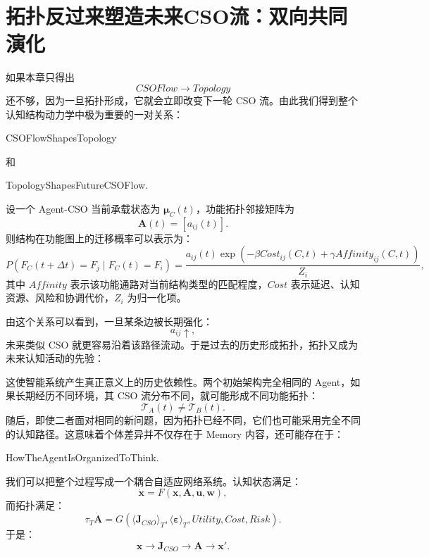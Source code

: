 \section{拓扑反过来塑造未来CSO流：双向共同演化}

如果本章只得出
\[
CSOFlow\rightarrow Topology
\]
还不够，因为一旦拓扑形成，它就会立即改变下一轮 CSO 流。由此我们得到整个认知结构动力学中极为重要的一对关系：
\begin{statementbox}
CSOFlowShapesTopology
\end{statementbox}
和
\begin{statementbox}
TopologyShapesFutureCSOFlow.
\end{statementbox}

设一个 Agent-CSO 当前承载状态为 $\boldsymbol{\mu}_C(t)$，功能拓扑邻接矩阵为
\[
\mathbf{A}(t)
=
[a_{ij}(t)].
\]
则结构在功能图上的迁移概率可以表示为：
\[
P
\left(
F_C(t+\Delta t)=F_j
\mid
F_C(t)=F_i
\right)
=
\frac{
a_{ij}(t)
\exp
\left(
-\beta Cost_{ij}(C,t)
+\gamma Affinity_{ij}(C,t)
\right)
}{
Z_i
},
\]
其中 $Affinity$ 表示该功能通路对当前结构类型的匹配程度，$Cost$ 表示延迟、认知资源、风险和协调代价，$Z_i$ 为归一化项。

由这个关系可以看到，一旦某条边被长期强化：
\[
a_{ij}\uparrow,
\]
未来类似 CSO 就更容易沿着该路径流动。于是过去的历史形成拓扑，拓扑又成为未来认知活动的先验：
\begin{statementbox}
\centering
{}
\end{statementbox}

这使智能系统产生真正意义上的历史依赖性。两个初始架构完全相同的 Agent，如果长期经历不同环境，其 CSO 流分布不同，就可能形成不同功能拓扑：
\[
\mathcal T_A(t)
\neq
\mathcal T_B(t).
\]
随后，即使二者面对相同的新问题，因为拓扑已经不同，它们也可能采用完全不同的认知路径。这意味着个体差异并不仅存在于 Memory 内容，还可能存在于：
\begin{statementbox}
HowTheAgentIsOrganizedToThink.
\end{statementbox}

我们可以把整个过程写成一个耦合自适应网络系统。认知状态满足：
\[
\dot{\mathbf{x}}
=
F
\left(
\mathbf{x},
\mathbf{A},
\mathbf{u},
\mathbf{w}
\right),
\]
而拓扑满足：
\[
\tau_T
\dot{\mathbf{A}}
=
G
\left(
\langle\mathbf{J}_{CSO}\rangle_T,
\langle\boldsymbol{\varepsilon}\rangle_T,
Utility,
Cost,
Risk
\right).
\]
于是：
\[
\boxed{
\mathbf{x}
\longrightarrow
\mathbf{J}_{CSO}
\longrightarrow
\mathbf{A}
\longrightarrow
\mathbf{x}'.
}
\]

